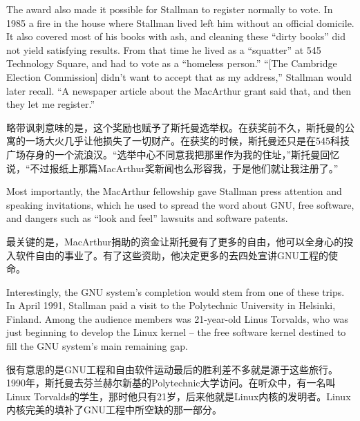 \ifdefined\eng
The award also made it possible for Stallman to register normally to vote. In 1985 a fire in the house where Stallman lived left him without an official domicile.  It also covered most of his books with ash, and cleaning these ``dirty books'' did not yield satisfying results. From that time he lived as a ``squatter'' at 545 Technology Square, and had to vote as a ``homeless person.'' ``[The Cambridge Election Commission] didn't want to accept that as my address,'' Stallman would later recall. ``A newspaper article about the MacArthur grant said that, and then they let me register.''
\fi

\ifdefined\chs

略带讽刺意味的是，这个奖励也赋予了斯托曼选举权。在获奖前不久，斯托曼的公寓的一场大火几乎让他损失了一切财产。在获奖的时候，斯托曼还只是在545科技广场存身的一个流浪汉。“选举中心不同意我把那里作为我的住址，”斯托曼回忆说，“不过报纸上那篇MacArthur奖新闻也么形容我，于是他们就让我注册了。”
\fi

\ifdefined\eng
Most importantly, the MacArthur fellowship gave Stallman press attention and speaking invitations, which he used to spread the word about GNU, free software, and dangers such as ``look and feel'' lawsuits and software patents.
\fi

\ifdefined\chs
最关键的是，MacArthur捐助的资金让斯托曼有了更多的自由，他可以全身心的投入软件自由的事业了。有了这些资助，他决定更多的去四处宣讲GNU工程的使命。
\fi

\ifdefined\eng
Interestingly, the GNU system's completion would stem from one of these trips. In April 1991, Stallman paid a visit to the Polytechnic University in Helsinki, Finland. Among the audience members was 21-year-old Linus Torvalds, who was just beginning to develop the Linux kernel -- the free software kernel destined to fill the GNU system's main remaining gap.
\fi

\ifdefined\chs
很有意思的是GNU工程和自由软件运动最后的胜利差不多就是源于这些旅行。1990年，斯托曼去芬兰赫尔新基的Polytechnic大学访问。在听众中，有一名叫Linux Torvalds的学生，那时他只有21岁，后来他就是Linux内核的发明者。Linux内核完美的填补了GNU工程中所空缺的那一部分。
\fi

